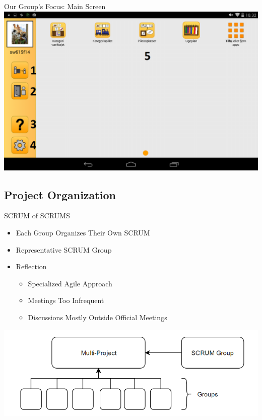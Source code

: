 \begin{frame}{Our Group's Focus: Main Screen}
\includegraphics[scale=0.28]{figures/MenuGuardian.png} 
\end{frame}

\subsection{Project Organization}
\begin{frame}{SCRUM of SCRUMS}
\begin{itemize} 
	\item Each Group Organizes Their Own SCRUM
	\item Representative SCRUM Group
	\item Reflection
		\begin{itemize}
		    \item Specialized Agile Approach
		    \item Meetings Too Infrequent
		    \item Discussions Mostly Outside Official Meetings
		\end{itemize}
\end{itemize}
\includegraphics[scale=0.42]{figures/SoS.png} 
\end{frame}

